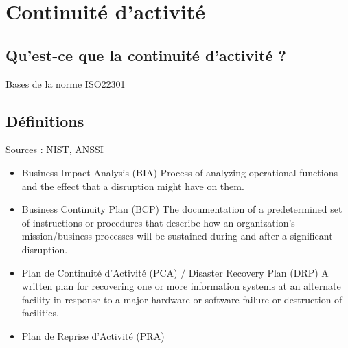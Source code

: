 
\section{Continuité d'activité}
\subsection{Qu’est-ce que la continuité d’activité ?}
Bases de la norme ISO22301
\subsection{Définitions}
Sources : NIST, ANSSI
\begin{itemize}
    \item Business Impact Analysis (BIA)
    Process of analyzing operational functions and the effect that a disruption might have on them.
    \item Business Continuity Plan (BCP)
    The documentation of a predetermined set of instructions or procedures that describe how an organization’s mission/business processes will be sustained during and after a significant disruption.
    \item Plan de Continuité d'Activité (PCA) / Disaster Recovery Plan (DRP)
     A written plan for recovering one or more information systems at an alternate facility in response to a major hardware or software failure or destruction of facilities.
    \item Plan de Reprise d'Activité (PRA)
\end{itemize}





